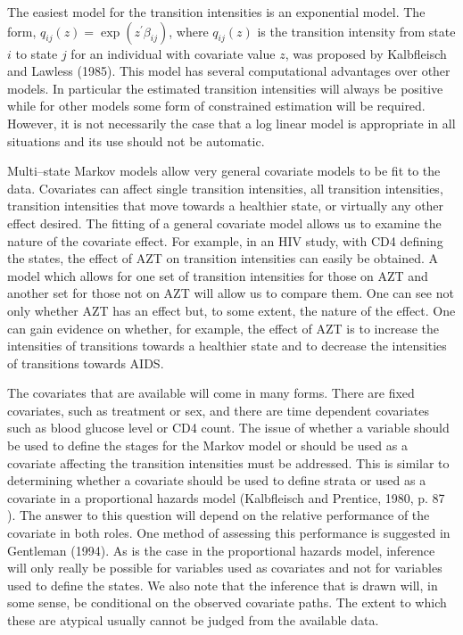\documentclass[12pt]{article}
\begin{document}
The easiest model for the transition intensities is an exponential model. 
The form,
$q_{ij}(z) = \exp(  z^\prime \beta_{ij})$, where
$q_{ij}(z)$ is the transition intensity from state $i$ to 
state $j$ for an individual with covariate value $z$, 
was proposed by Kalbfleisch and Lawless (1985).
This model has several 
computational advantages over other models. 
In particular the estimated transition intensities will always be positive
while for other models some form of constrained estimation will be required. 
However, it is not necessarily the case that a log linear model is
appropriate in all situations and its use should not be automatic.

Multi--state Markov models allow very general covariate models to be fit to the data.
Covariates can affect single transition intensities, all transition intensities,
transition intensities that move towards a healthier state, or virtually any
other effect desired.
The fitting of a general covariate model allows us to examine the nature of the
covariate effect.
For example,
in an HIV study, with CD4 defining the states, the effect of AZT on transition
intensities can easily be obtained.
A model which allows for one set of transition intensities for those on AZT and
another set for those not on AZT will allow us to compare them.
One can see not only whether AZT has an effect but, to some extent, the
nature of the effect.
One can gain evidence on whether, for example, the effect of AZT is to increase the 
intensities of transitions
towards a healthier state and to decrease the intensities of
transitions towards AIDS. 

The covariates that are available will come in many forms.
There are fixed covariates, such as treatment or sex,
and there are time dependent covariates such as blood glucose 
level or CD4 count.
The issue of whether a variable should be used to define
the stages for the Markov model or should be used as a covariate
affecting the transition intensities must be addressed.
This is similar to determining whether a covariate should
be used to define strata or used as a covariate in a proportional
hazards model (Kalbfleisch and Prentice, 1980, p. 87 ).
The answer to this question will depend on the relative
performance of the covariate in both roles.
One method of assessing this performance is suggested in Gentleman (1994).
As is the case in the proportional hazards model, inference will only 
really be possible for variables used as covariates and not 
for variables used to define the states.
We also note that the inference that is drawn will, in some sense,
be conditional on the observed covariate paths. 
The extent to which these are atypical usually cannot be judged
from the available data.
\end{document}
